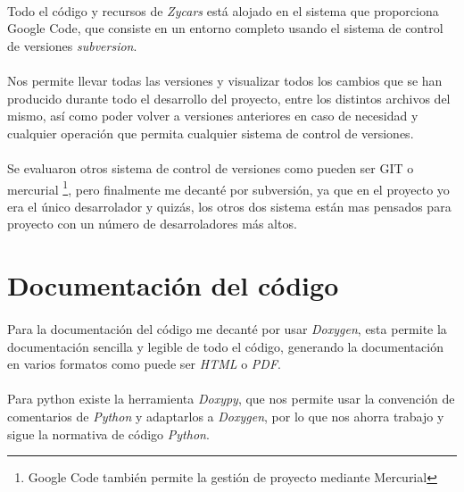 \paragraph{}
Todo el código y recursos de \emph{Zycars} está alojado en el sistema que proporciona Google Code, que consiste en un entorno completo
usando el sistema de control de versiones \emph{subversion}.

\paragraph{}
Nos permite llevar todas las versiones y visualizar todos los cambios que se han producido durante todo el desarrollo del proyecto,
entre los distintos archivos del mismo, así como poder volver a versiones anteriores en caso de necesidad y cualquier operación
que permita cualquier sistema de control de versiones.

\paragraph{}
Se evaluaron otros sistema de control de versiones como pueden ser GIT o mercurial \footnote{Google Code también permite la gestión
de proyecto mediante Mercurial}, pero finalmente me decanté por subversión, ya que en el proyecto yo era el único desarrolador y 
quizás, los otros dos sistema están mas pensados para proyecto con un número de desarroladores más altos.

\section{Documentación del código}

\paragraph{}
Para la documentación del código me decanté por usar \emph{Doxygen}, esta permite la documentación sencilla y legible de todo el 
código, generando la documentación en varios formatos como puede ser \emph{HTML} o \emph{PDF}.

\paragraph{}
Para python existe la herramienta \emph{Doxypy}, que nos permite usar la convención de comentarios de \emph{Python} y adaptarlos a
\emph{Doxygen}, por lo que nos ahorra trabajo y sigue la normativa de código \emph{Python}.

